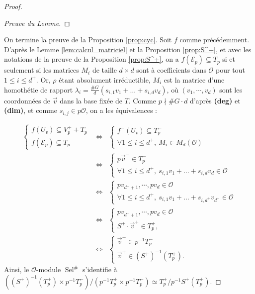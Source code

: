 \documentclass[10pt,a4paper]{amsart}
\DeclareMathOperator{\Sel}{Sel}
\newcommand\cE{\mathcal{E}}
\newcommand\cO{\mathcal{O}}
\begin{document}
\begin{proof}
\begin{proof}[Preuve du Lemme]
	\end{proof}
	On termine la preuve de la Proposition \ref{prop:cyc}. Soit $f$ comme précédemment. D'après le Lemme \ref{lem:calcul_matriciel} et la Proposition \ref{prop:S^+}, et avec les notations de la preuve de la Proposition \ref{prop:S^+}, on a $f(\cE_p)\subseteq T_p$ si et seulement si les matrices $M_i$ de taille $d\times d$ sont à coefficients dans $\cO$ pour tout $1\leq i \leq d^+$. Or, $\rho$ étant absolument irréductible, $M_i$ est la matrice d'une homothétie de rapport $\lambda_i=\frac{\#G}{d} \left(s_{i,1}v_1+\ldots + s_{i,d}v_d\right)$, où $(v_1,\cdots,v_d)$ sont les coordonnées de $\vec{v}$ dans la base fixée de $T$. Comme $p\nmid \#G \cdot d$ d'après \textbf{(deg)} et \textbf{(dim)}, et comme $s_{i,j}\in p\cO$, on a les équivalences : 
	
	$$\begin{array}{rcl}
	\left\{\begin{array}{l}
	f(U_{v}) \subseteq V_p^+ +T_p \\ f(\cE_p)\subseteq T_p 
	\end{array}\right. &\Longleftrightarrow & \left\{\begin{array}{l}
	f^-(U_{v}) \subseteq T_p^- \\ \forall 1\leq i \leq d^+, \  M_i\in M_d(\cO) 
	\end{array}\right. \\
	&\Longleftrightarrow & \left\{\begin{array}{l}
	p\vec{v}^-\in T_p^- \\ \forall 1 \leq i \leq d^+, \ s_{i,1}v_1+\ldots + s_{i,d}v_{d}\in \cO
	\end{array}\right. \\
	&\Longleftrightarrow & \left\{\begin{array}{l}
	pv_{d^++1},\cdots,pv_d\in \cO \\ \forall 1 \leq i \leq d^+, \ s_{i,1}v_1+\ldots + s_{i,d^+}v_{d^+}\in \cO 
	\end{array}\right. \\
	&\Longleftrightarrow & \left\{\begin{array}{l}
	pv_{d^++1},\cdots,pv_d\in \cO \\ S^+ \cdot\vec{v}^+ \in T_p^+ ,
	\end{array}\right. \\
	&\Longleftrightarrow & \left\{\begin{array}{l}
	\vec{v}^-\in p^{-1}T_p^- \\ \vec{v}^+ \in \left(S^+\right)^{-1}(T_p^+).
	\end{array}\right. 
	\end{array}
	$$
	Ainsi, le $\cO$-module $\Sel^\#$ s'identifie à $\left(\left(S^+\right)^{-1}(T_p^+) \times p^{-1}T_p^-\right) /\left(p^{-1}T_p^+ \times p^{-1}T_p^-\right) \simeq T_p^+/p^{-1}S^+\left(T_p^+\right)$.
	
\end{proof} 
\end{document}
